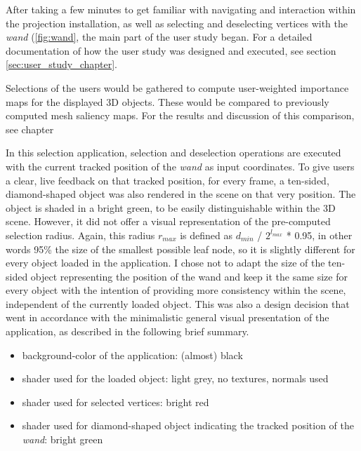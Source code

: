 After taking a few minutes to get familiar with navigating and interaction within the projection installation, as well as selecting and deselecting vertices with the \textit{wand} (\ref{fig:wand}, the main part of the user study began. For a detailed documentation of how the user study was designed and executed, see section \ref{sec:user_study_chapter}.

Selections of the users would be gathered to compute user-weighted importance maps for the displayed 3D objects. These would be compared to previously computed mesh saliency maps. For the results and discussion of this comparison, see chapter 

In this selection application, selection and deselection operations are executed with the current tracked position of the \textit{wand} as input coordinates. To give users a clear, live feedback on that tracked position, for every frame, a ten-sided, diamond-shaped object was also rendered in the scene on that very position. The object is shaded in a bright green, to be easily distinguishable within the 3D scene. However, it did not offer a visual representation of the pre-computed selection radius. Again, this radius $r_{max}$ is defined as $d_{min}$ / $2^{l_{max}}$ * 0.95, in other words 95\% the size of the smallest possible leaf node, so it is slightly different for every object loaded in the application. I chose not to adapt the size of the ten-sided object representing the position of the wand and keep it the same size for every object with the intention of providing more consistency within the scene, independent of the currently loaded object. This was also a design decision that went in accordance with the minimalistic general visual presentation of the application, as described in the following brief summary.

\begin{itemize}
	\item background-color of the application: (almost) black
	\item shader used for the loaded object: light grey, no textures, normals used
	\item shader used for selected vertices: bright red
	\item shader used for diamond-shaped object indicating the tracked position of the \textit{wand}: bright green
\end{itemize}


